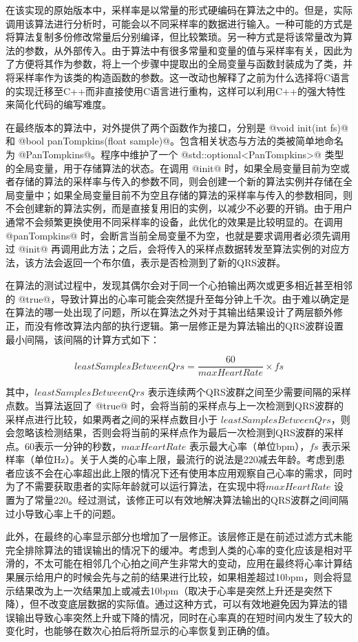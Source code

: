 在该实现的原始版本中，采样率是以常量的形式硬编码在算法之中的。但是，实际调用该算法进行分析时，可能会以不同采样率的数据进行输入。一种可能的方式是将算法复制多份修改常量后分别编译，但比较繁琐。另一种方式是将该常量改为算法的参数，从外部传入。由于算法中有很多常量和变量的值与采样率有关，因此为了方便将其作为参数，将上一个步骤中提取出的全局变量与函数封装成为了类，并将采样率作为该类的构造函数的参数。这一改动也解释了之前为什么选择将C语言的实现迁移至C++而非直接使用C语言进行重构，这样可以利用C++的强大特性来简化代码的编写难度。

在最终版本的算法中，对外提供了两个函数作为接口，分别是 @void init(int fs)@ 和 @bool panTompkins(float sample)@。包含相关状态与方法的类被简单地命名为 @PanTompkins@。程序中维护了一个 @std::optional<PanTompkins>@ 类型的全局变量，用于存储算法的状态。在调用 @init@ 时，如果全局变量目前为空或者存储的算法的采样率与传入的参数不同，则会创建一个新的算法实例并存储在全局变量中；如果全局变量目前不为空且存储的算法的采样率与传入的参数相同，则不会创建新的算法实例，而是直接复用旧的实例，以减少不必要的开销。由于用户通常不会频繁更换使用不同采样率的设备，此优化的效果是比较明显的。在调用 @panTompkins@ 时，会断言当前全局变量不为空，也就是要求调用者必须先调用过 @init@ 再调用此方法；之后，会将传入的采样点数据转发至算法实例的对应方法，该方法会返回一个布尔值，表示是否检测到了新的QRS波群。

在算法的测试过程中，发现其偶尔会对于同一个心拍输出两次或更多相近甚至相邻的 @true@，导致计算出的心率可能会突然提升至每分钟上千次。由于难以确定是在算法的哪一处出现了问题，所以在算法之外对于其输出结果设计了两层额外修正，而没有修改算法内部的执行逻辑。第一层修正是为算法输出的QRS波群设置最小间隔，该间隔的计算方式如下：

\[
    leastSamplesBetweenQrs = \frac{60}{maxHeartRate} \times fs
\]

其中，\(leastSamplesBetweenQrs\) 表示连续两个QRS波群之间至少需要间隔的采样点数。当算法返回了 @true@ 时，会将当前的采样点与上一次检测到QRS波群的采样点进行比较，如果两者之间的采样点数目小于 \(leastSamplesBetweenQrs\)，则会忽略该检测结果，否则会将当前的采样点作为最后一次检测到QRS波群的采样点。60表示一分钟的秒数，\(maxHeartRate\) 表示最大心率（单位bpm），\(fs\) 表示采样率（单位Hz）。关于人类的心率上限，最流行的说法是220减去年龄。考虑到患者应该不会在心率超出此上限的情况下还有使用本应用观察自己心率的需求，同时为了不需要获取患者的实际年龄就可以运行算法，在实现中将\(maxHeartRate\) 设置为了常量220。经过测试，该修正可以有效地解决算法输出的QRS波群之间间隔过小导致心率上千的问题。

此外，在最终的心率显示部分也增加了一层修正。该层修正是在前述过滤方式未能完全排除算法的错误输出的情况下的缓冲。考虑到人类的心率的变化应该是相对平滑的，不太可能在相邻几个心拍之间产生非常大的变动，应用在最终将心率计算结果展示给用户的时候会先与之前的结果进行比较，如果相差超过10bpm，则会将显示结果改为上一次结果加上或减去10bpm（取决于心率是突然上升还是突然下降），但不改变底层数据的实际值。通过这种方式，可以有效地避免因为算法的错误输出导致心率突然上升或下降的情况，同时在心率真的在短时间内发生了较大的变化时，也能够在数次心拍后将所显示的心率恢复到正确的值。


